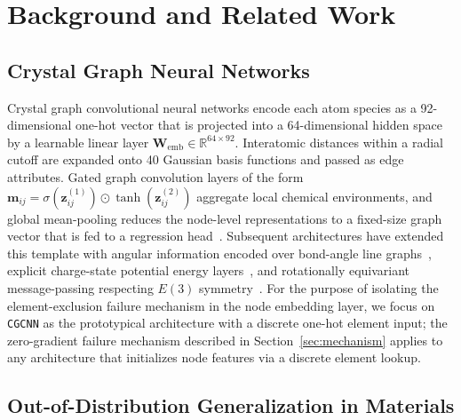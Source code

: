 \documentclass[final,5p,twocolumn,10pt]{elsarticle}
\newcommand{\cgcnn}{\texttt{CGCNN}}
\begin{document}
\section{Background and Related Work}
\label{sec:related}

\subsection{Crystal Graph Neural Networks}

Crystal graph convolutional neural networks encode each atom species as a
92-dimensional one-hot vector that is projected into a 64-dimensional
hidden space by a learnable linear layer $\bm{W}_{\text{emb}} \in \mathbb{R}^{64 \times 92}$.
Interatomic distances within a radial cutoff are expanded onto 40 Gaussian
basis functions and passed as edge attributes. Gated graph convolution layers
of the form $\bm{m}_{ij} = \sigma(\bm{z}^{(1)}_{ij}) \odot \tanh(\bm{z}^{(2)}_{ij})$
aggregate local chemical environments, and global mean-pooling reduces the
node-level representations to a fixed-size graph vector that is fed to a
regression head~\cite{xie2018crystal}. Subsequent architectures have
extended this template with angular information encoded over bond-angle
line graphs~\cite{choudhary2021atomistic}, explicit charge-state potential
energy layers~\cite{deng2023chgnet}, and rotationally equivariant
message-passing respecting $E(3)$ symmetry~\cite{batatia2022mace}.
For the purpose of isolating the element-exclusion failure mechanism in
the node embedding layer, we focus on \cgcnn{} as the prototypical
architecture with a discrete one-hot element input; the zero-gradient
failure mechanism described in Section~\ref{sec:mechanism} applies to
any architecture that initializes node features via a discrete element lookup.

\subsection{Out-of-Distribution Generalization in Materials}
\end{document}
